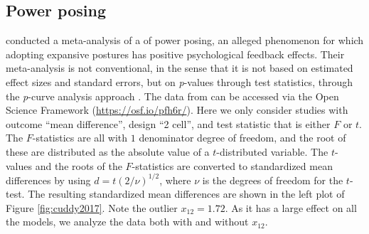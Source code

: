 \documentclass{article}
\theoremstyle{plain}
\theoremstyle{definition}
\renewcommand{\sqrt}[1]{(#1)^{1/2}}
\begin{document}
\subsection{Power posing\label{subsec:cuddy2018}}

\citet{cuddy2018p} conducted a meta-analysis of a of power posing, an alleged phenomenon for which adopting expansive postures has positive psychological feedback effects. Their meta-analysis is not conventional, in the sense that it is not based on estimated effect sizes and standard errors, but on \textit{p}-values through test statistics, through the \textit{p}-curve analysis approach \citep{simonsohn2014p}. The data from \citet{cuddy2018p} can be accessed via the Open Science Framework (\url{https://osf.io/pfh6r/}). Here we only consider studies with outcome \enquote{mean difference}, design \enquote{2 cell}, and test statistic that is either $F$ or $t$. The $F$-statistics are all with $1$ denominator degree of freedom, and the root of these are distributed as the absolute value of a $t$-distributed variable. The $t$-values and the roots of the $F$-statistics are converted to standardized mean differences by using $d = t\sqrt{2/\nu}$, where $\nu$ is the degrees of freedom for the $t$-test. The resulting standardized mean differences are shown in the left plot of Figure \ref{fig:cuddy2017}. Note the outlier $x_{12} = 1.72$. As it has a large effect on all the models, we analyze the data both with and without $x_{12}$.
\end{document}
